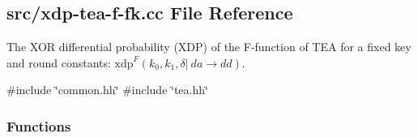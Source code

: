 \hypertarget{xdp-tea-f-fk_8cc}{\subsection{src/xdp-\/tea-\/f-\/fk.cc \-File \-Reference}
\label{xdp-tea-f-fk_8cc}
}


\-The \-X\-O\-R differential probability (\-X\-D\-P) of the \-F-\/function of \-T\-E\-A for a fixed key and round constants\-: $\mathrm{xdp}^{F}(k_0, k_1, \delta |~ da \rightarrow dd)$.  


{\ttfamily \#include \char`\"{}common.\-hh\char`\"{}}\*
{\ttfamily \#include \char`\"{}tea.\-hh\char`\"{}}\*
\subsubsection*{\-Functions}
